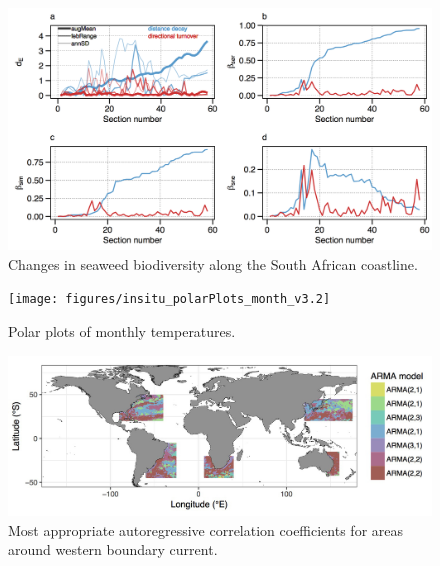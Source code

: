 \documentclass[
]{book}
\begin{document}
\begin{figure}

{\centering \includegraphics[width=1\linewidth]{figures/Ecography_figure5a-d} 

}

\caption{Changes in seaweed biodiversity along the South African coastline.}\label{fig:example4}
\end{figure}

\begin{figure}

{\centering \texttt{[image: figures/insitu\_polarPlots\_month\_v3.2]} 

}

\caption{Polar plots of monthly temperatures.}\label{fig:example16}
\end{figure}

\begin{figure}

{\centering \includegraphics[width=1\linewidth]{figures/mo_coef} 

}

\caption{Most appropriate autoregressive correlation coefficients for areas around western boundary current.}\label{fig:example9}
\end{figure}
\end{document}
